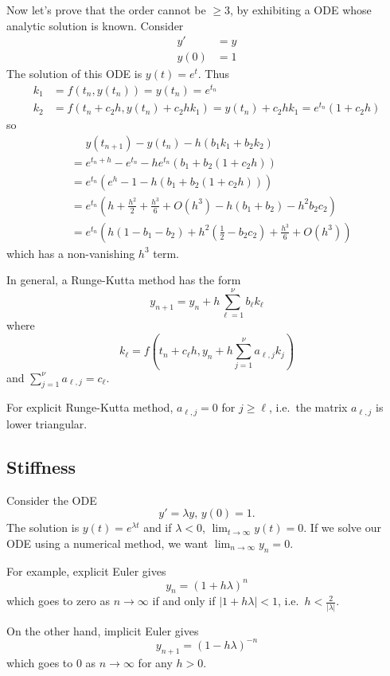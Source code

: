 \documentclass[a4paper]{article}
\begin{document}
Now let's prove that the order cannot be \(\geq 3\), by exhibiting a ODE whose analytic solution is known. Consider
\begin{align*}
  y' &= y \\
  y(0) &= 1
\end{align*}
The solution of this ODE is \(y(t) = e^t\). Thus
\begin{align*}
  k_1 &= f(t_n, y(t_n)) = y(t_n) = e^{t_n} \\
  k_2 &= f(t_n + c_2h, y(t_n) + c_2hk_1) = y(t_n) + c_2hk_1 = e^{t_n}(1 + c_2h)
\end{align*}
so
\begin{align*}
  &\phantom{={}}y(t_{n + 1}) - y(t_n) - h(b_1k_1 + b_2k_2) \\
  &= e^{t_n + h} - e^{t_n} - he^{t_n}(b_1 + b_2(1 + c_2h)) \\
  &= e^{t_n}(e^h - 1 -h(b_1 + b_2(1 + c_2h))) \\
  &= e^{t_n}(h + \frac{h^2}{2} + \frac{h^3}{6} + O(h^3) - h(b_1 + b_2) - h^2b_2c_2) \\
  &= e^{t_n}(h(1 - b_1 - b_2) + h^2(\frac{1}{2} - b_2c_2) + \frac{h^3}{6} + O(h^3))
\end{align*}
which has a non-vanishing \(h^3\) term.

In general, a Runge-Kutta method has the form
\[
  y_{n + 1} = y_n + h \sum_{\ell = 1}^\nu b_\ell k_\ell
\]
where
\[
  k_\ell = f(t_n + c_\ell h, y_n + h \sum_{j = 1}^\nu a_{\ell, j} k_j)
\]
and \(\sum_{j = 1}^\nu a_{\ell, j} = c_\ell\).

For explicit Runge-Kutta method, \(a_{\ell, j} = 0\) for \(j \geq \ell\), i.e.\ the matrix \(a_{\ell, j}\) is lower triangular.

\subsection{Stiffness}

Consider the ODE
\[
  y' = \lambda y, \, y(0) = 1.
\]
The solution is \(y(t) = e^{\lambda t}\) and if \(\lambda < 0\), \(\lim_{t \to \infty} y(t) = 0\). If we solve our ODE using a numerical method, we want \(\lim_{n \to \infty} y_n = 0\).

For example, explicit Euler gives
\[
  y_n = (1  + h\lambda)^n
\]
which goes to zero as \(n \to \infty\) if and only if \(|1 + h\lambda| < 1\), i.e.\ \(h < \frac{2}{|\lambda|}\).

On the other hand, implicit Euler gives
\[
  y_{n + 1} = (1 - h\lambda)^{-n}
\]
which goes to \(0\) as \(n \to \infty\) for any \(h > 0\).
\end{document}
